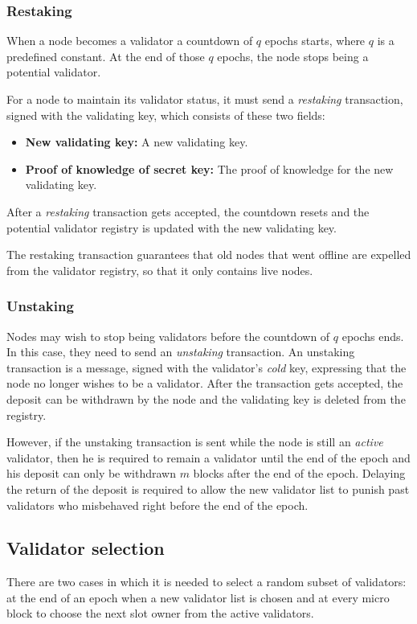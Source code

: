 \documentclass[conference]{IEEEtran}
\begin{document}
\subsubsection{Restaking} \label{restake}
When a node becomes a validator a countdown of $q$ epochs starts, where $q$ is a predefined constant. At the end of those $q$ epochs, the node stops being a potential validator.

For a node to maintain its validator status, it must send a \textit{restaking} transaction, signed with the validating key, which consists of these two fields:

\begin{itemize}
	\item \textbf{New validating key:} A new validating key.
	\item \textbf{Proof of knowledge of secret key:} The proof of knowledge for the new validating key.
\end{itemize}

After a \textit{restaking} transaction gets accepted, the countdown resets and the potential validator registry is updated with the new validating key.

The restaking transaction guarantees that old nodes that went offline are expelled from the validator registry, so that it only contains live nodes.

\subsubsection{Unstaking}
Nodes may wish to stop being validators before the countdown of $q$ epochs ends. In this case, they need to send an \textit{unstaking} transaction. An unstaking transaction is a message, signed with the validator's \textit{cold} key, expressing that the node no longer wishes to be a validator. After the transaction gets accepted, the deposit can be withdrawn by the node and the validating key is deleted from the registry.

However, if the unstaking transaction is sent while the node is still an \textit{active} validator, then he is required to remain a validator until the end of the epoch and his deposit can only be withdrawn $m$ blocks after the end of the epoch.
Delaying the return of the deposit is required to allow the new validator list to punish past validators who misbehaved right before the end of the epoch.

\subsection{Validator selection}
There are two cases in which it is needed to select a random subset of validators: at the end of an epoch when a new validator list is chosen and at every micro block to choose the next slot owner from the active validators.
\end{document}
